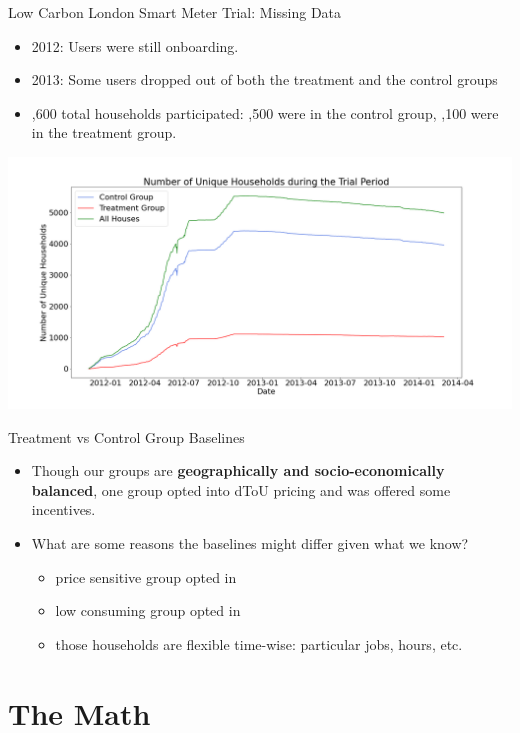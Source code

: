 \documentclass{beamer}
\begin{document}
\begin{frame}{Low Carbon London Smart Meter Trial: Missing Data}
  \begin{itemize}
    \item 2012: Users were still onboarding.
    \item 2013: Some users dropped out of both the treatment and the control groups
    \item {},600 total households participated: ,500 were in the control group, ,100 were in the treatment group.
  \end{itemize}
  \vspace{-0.25cm}
  \includegraphics[width=1\textwidth]{images/house-count.png}
\end{frame}

\begin{frame}{Treatment vs Control Group Baselines}
  \begin{itemize}
    \item<+-> Though our groups are \textbf{geographically and socio-economically balanced}, one group opted into dToU pricing and was offered some incentives.
    \item<+-> What are some reasons the baselines might differ given what we know?
    \begin{itemize}
      \item<+-> price sensitive group opted in
      \item<+-> low consuming group opted in
      \item<+-> those households are flexible time-wise: particular jobs, hours, etc.\
    \end{itemize}
  \end{itemize}
\end{frame}

\section{The Math}
\end{document}
